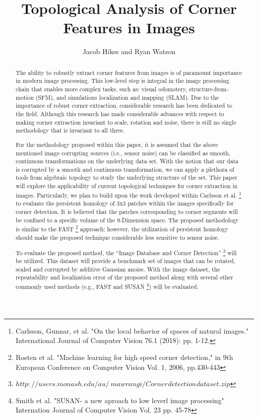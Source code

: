 \documentclass[12pt]{article}
\title{Topological Analysis of Corner Features in Images}
\author{Jacob Hikes and Ryan Watson}
\begin{document}
\begin{titlepage}
\clearpage\maketitle
\thispagestyle{empty}
\end{titlepage}

\begin{abstract}

	The ability to robustly extract corner features from images is of paramount importance in modern image processing. This low-level step is integral in the image processing chain that enables more complex tasks, such as: visual odomotery, structure-from-motion (SFM), and simulations localization and mapping (SLAM). Due to the importance of robust corner extraction, considerable research has been dedicated to the field. Although this research has made considerable advances with respect to making corner extraction invariant to scale, rotation and noise, there is still no single methodology that is invariant to all three. 
	
	For the methodology proposed within this paper, it is assumed that the above mentioned image corrupting sources (i.e., sensor noise) can be classified as smooth, continuous transformations on the underlying data set. With the notion that our data is corrupted by a smooth and continuous transformation, we can apply a plethora of tools from algebraic topology to study the underlying structure of the set. This paper will explore the applicability of current topological techniques for corner extraction in images. Particularly, we plan to build upon the work developed within Carlsson et al. \footnote{Carlsson, Gunnar, et al. "On the local behavior of spaces of natural images." International Journal of Computer Vision 76.1 (2018): pp. 1-12.} to evaluate the persistent homology of 3x3 patches within the images specifically for corner detection. It is believed that the patches corresponding to corner segments will be confined to a specific volume of the 9-Dimension space. The proposed methodology is similar to the FAST \footnote{Rosten et al. "Machine learning for high speed corner detection," in 9th European Conference on Computer Vision Vol. 1, 2006, pp.430-443} approach; however, the utilization of persistent homology should make the proposed technique considerable less sensitive to sensor noise.
	
	To evaluate the proposed method, the  ``Image Database and Corner Detection'' \footnote{$http://users.monash.edu/au/~mawrangi/Corner_{}detection_{}dataset.zip$} will be utilized. This dataset will provide a benchmark set of images that can be rotated, scaled and corrupted by additive Gaussian anoise. With the image dataset, the repeatability and localization error of the proposed method along with several other commonly used methods (e.g., FAST  and SUSAN \footnote{Smith et al. "SUSAN- a new aproach to low leverl image processing" Internation Journal of Computer Vision Vol. 23 pp. 45-78}) will be evaluated. 
	
\end{abstract}
\end{document}
